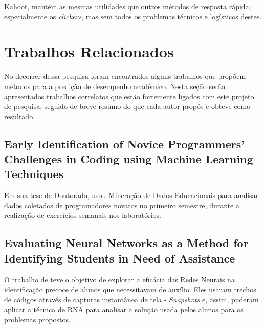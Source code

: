 \documentclass[
	12pt,				%
	openright,			%
	oneside,
	a4paper,			%
	english,			%
	french,				%
	spanish,			%
	brazil,				%
	]{abntex2}
\begin{document}

Kahoot, mantém as mesmas utilidades que outros métodos de resposta rápida; especialmente os \textit{clickers}, mas sem todos os problemas técnicos e logísticos destes. \cite{pintor2014kahoot}

\section{Trabalhos Relacionados}
\label{sec:TR}
No decorrer dessa pesquisa foram encontrados alguns trabalhos que propõem métodos para a predição de desempenho acadêmico. Nesta seção serão apresentados trabalhos correlatos que estão fortemente ligados com este projeto de pesquisa, seguido de breve resumo do que cada autor propôs e obteve como resultado.

\subsection{Early Identification of Novice Programmers' Challenges in Coding using Machine Learning Techniques}
\label{sec:Early}
Em sua tese de Doutorado,  usou Mineração de Dados Educacionais para analisar dados coletados de programadores novatos no primeiro semestre, durante a realização de exercícios semanais nos laboratórios.

\subsection{Evaluating Neural Networks as a Method for Identifying Students in Need of Assistance}
\label{sec:Evaluating}
O trabalho de  teve o objetivo de explorar a eficácia das Redes Neurais na identificação precoce de alunos que necessitavam de auxílio. Eles usaram trechos de códigos através de capturas instantânea de tela - \textit{Snapshots} e, assim, puderam aplicar a técnica de RNA para analisar a solução usada pelos alunos para os problemas propostos.
\end{document}
